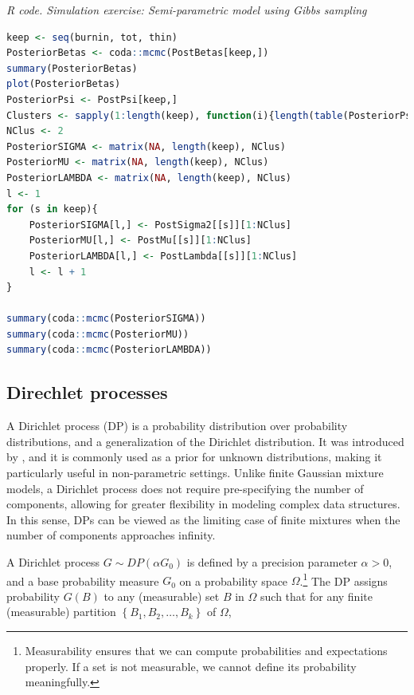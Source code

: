 \begin{tcolorbox}[enhanced,width=4.67in,center upper,
	fontupper=\large\bfseries,drop shadow southwest,sharp corners]
	\textit{R code. Simulation exercise: Semi-parametric model using Gibbs sampling}
	\begin{VF}
		\begin{lstlisting}[language=R]
keep <- seq(burnin, tot, thin)
PosteriorBetas <- coda::mcmc(PostBetas[keep,])
summary(PosteriorBetas)
plot(PosteriorBetas)
PosteriorPsi <- PostPsi[keep,]
Clusters <- sapply(1:length(keep), function(i){length(table(PosteriorPsi[i,]))})
NClus <- 2
PosteriorSIGMA <- matrix(NA, length(keep), NClus)
PosteriorMU <- matrix(NA, length(keep), NClus)
PosteriorLAMBDA <- matrix(NA, length(keep), NClus)
l <- 1
for (s in keep){
	PosteriorSIGMA[l,] <- PostSigma2[[s]][1:NClus]
	PosteriorMU[l,] <- PostMu[[s]][1:NClus]
	PosteriorLAMBDA[l,] <- PostLambda[[s]][1:NClus]
	l <- l + 1
}

summary(coda::mcmc(PosteriorSIGMA))
summary(coda::mcmc(PosteriorMU))
summary(coda::mcmc(PosteriorLAMBDA))
\end{lstlisting}
	\end{VF}
\end{tcolorbox}


\subsection{Direchlet processes}\label{sec11_12}

A Dirichlet process (DP) is a probability distribution over probability distributions, and a generalization of the Dirichlet distribution. It was introduced by \cite{Ferguson1973}, and it is commonly used as a prior for unknown distributions, making it particularly useful in non-parametric settings. Unlike finite Gaussian mixture models, a Dirichlet process does not require pre-specifying the number of components, allowing for greater flexibility in modeling complex data structures. In this sense, DPs can be viewed as the limiting case of finite mixtures when the number of components approaches infinity. 

A Dirichlet process $G\sim DP(\alpha G_0)$ is defined by a precision parameter $\alpha>0$, and a base probability measure $G_0$ on a probability space $\Omega$.\footnote{Measurability ensures that we can compute probabilities and expectations properly. If a set is not measurable, we cannot define its probability meaningfully.} The DP assigns probability $G(B)$ to any (measurable) set $B$ in $\Omega$ such that for any finite (measurable) partition $\left\{B_1, B_2, \dots, B_k\right\}$ of $\Omega$,  

